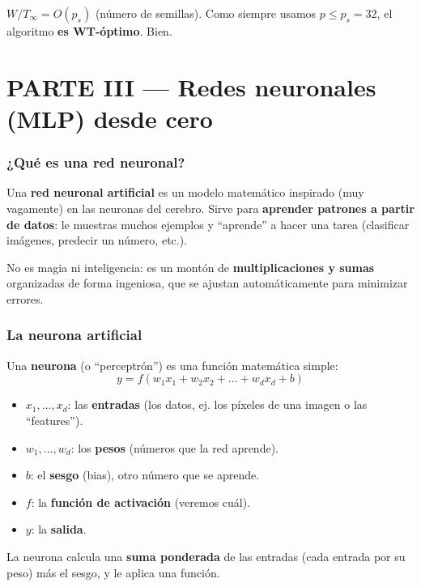 \documentclass[11pt,a4paper]{article}
\newcommand{\term}[1]{\textbf{\textcolor{clave}{#1}}}
\begin{document}
\begin{caja}[title=\textbf{En nuestro proyecto}]
$W/T_\infty = O(p_s)$ (número de semillas). Como siempre usamos $p \le p_s=32$,
el algoritmo \textbf{es WT-óptimo}. Bien.
\end{caja}

\part*{PARTE III --- Redes neuronales (MLP) desde cero}

\section{¿Qué es una red neuronal?}

Una \term{red neuronal artificial} es un modelo matemático inspirado (muy
vagamente) en las neuronas del cerebro. Sirve para \textbf{aprender patrones a
partir de datos}: le muestras muchos ejemplos y ``aprende'' a hacer una tarea
(clasificar imágenes, predecir un número, etc.).

No es magia ni inteligencia: es un montón de \textbf{multiplicaciones y sumas}
organizadas de forma ingeniosa, que se ajustan automáticamente para minimizar
errores.

\section{La neurona artificial}

Una \term{neurona} (o ``perceptrón'') es una función matemática simple:
\[
y = f(w_1 x_1 + w_2 x_2 + \ldots + w_d x_d + b)
\]
\begin{itemize}
  \item $x_1,\ldots,x_d$: las \textbf{entradas} (los datos, ej. los píxeles de
        una imagen o las ``features'').
  \item $w_1,\ldots,w_d$: los \textbf{pesos} (números que la red aprende).
  \item $b$: el \textbf{sesgo} (bias), otro número que se aprende.
  \item $f$: la \textbf{función de activación} (veremos cuál).
  \item $y$: la \textbf{salida}.
\end{itemize}

La neurona calcula una \textbf{suma ponderada} de las entradas (cada entrada por
su peso) más el sesgo, y le aplica una función.
\end{document}
